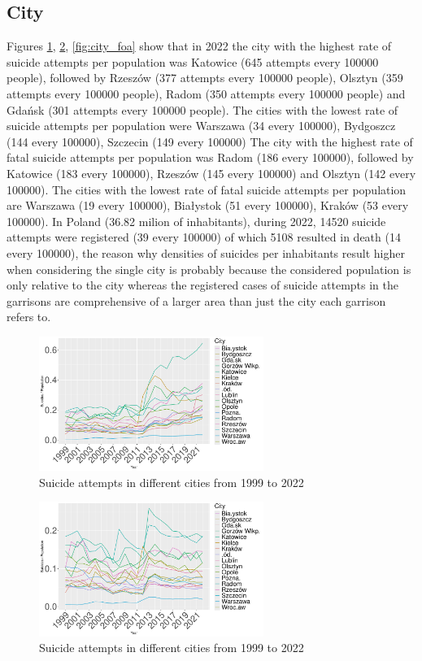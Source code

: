 \documentclass{article}
\begin{document}
\subsection{City}
Figures \ref{fig:city_att}, \ref{fig:city_fat}, \ref{fig:city_foa}
show that in 2022 the city with the highest rate of suicide attempts per population
was Katowice (645 attempts every 100000 people), followed by Rzeszów (377 attempts every 100000 people),
Olsztyn (359 attempts every 100000 people), Radom (350 attempts every 100000 people)
and Gdańsk (301 attempts every 100000 people).
The cities with the lowest rate of suicide attempts per population were Warszawa
(34 every 100000), Bydgoszcz (144 every 100000), Szczecin (149 every 100000) 
The city with the highest rate of fatal suicide attempts per population
was Radom (186 every 100000), followed by Katowice (183 every 100000),  
Rzeszów (145 every 100000) and Olsztyn (142 every 100000).
The cities with the lowest rate of fatal suicide attempts per population are 
Warszawa (19 every 100000), Białystok (51 every 100000), Kraków (53 every 100000).
In Poland (36.82 milion of inhabitants), during 2022, 14520 suicide attempts were
registered (39 every 100000) of which 5108 resulted in death (14 every 100000),
the reason why densities of suicides per inhabitants result higher when considering
the single city is probably because the considered population is only relative
to the city whereas the registered cases of suicide attempts in the garrisons
are comprehensive of a larger area than just the city each garrison refers to.
\begin{figure}[H]
	\centering
		\includegraphics[width=0.65\textwidth]{imgs/city_att.pdf}
		\caption{Suicide attempts in different cities from 1999 to 2022}
		\label{fig:city_att}
\end{figure}

\begin{figure}[H]
	\centering
		\includegraphics[width=0.65\textwidth]{imgs/city_fat.pdf}
		\caption{Suicide attempts in different cities from 1999 to 2022}
		\label{fig:city_fat}
\end{figure}
\end{document}
